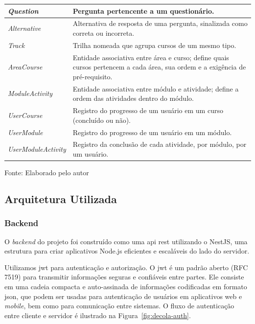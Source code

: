 \begin{quadro}[H]
{\begin{tabular}{|l|p{10.2cm}|}
        \hline
        \textit{Question} & Pergunta pertencente a um questionário. \\
        \hline
        \textit{Alternative} & Alternativa de resposta de uma pergunta, sinalizada como correta ou incorreta. \\
        \hline
        \textit{Track} & Trilha nomeada que agrupa cursos de um mesmo tipo. \\
        \hline
        \textit{AreaCourse} & Entidade associativa entre área e curso; define quais cursos pertencem a cada área, sua ordem e a exigência de pré-requisito. \\
        \hline
        \textit{ModuleActivity} & Entidade associativa entre módulo e atividade; define a ordem das atividades dentro do módulo. \\
        \hline
        \textit{UserCourse} & Registro do progresso de um usuário em um curso (concluído ou não). \\
        \hline
        \textit{UserModule} & Registro do progresso de um usuário em um módulo. \\
        \hline
        \textit{UserModuleActivity} & Registro da conclusão de cada atividade, por módulo, por um usuário. \\
        \hline
    \end{tabular}\par}

    Fonte: Elaborado pelo autor
    \label{quadro:decola-entidades}
\end{quadro}

\subsection{Arquitetura Utilizada}

\subsubsection{Backend}
  O \textit{backend} do projeto foi construído como uma \ac{api} \ac{rest} utilizando o NestJS, uma estrutura para criar aplicativos Node.js eficientes e escaláveis do lado do servidor.

  Utilizamos \ac{jwt} para autenticação e autorização. O \ac{jwt} é um padrão aberto (RFC 7519) para transmitir informações seguras e confiáveis entre partes. Ele consiste em uma cadeia compacta e auto-assinada de informações codificadas em formato \ac{json}, que podem ser usadas para autenticação de usuários em aplicativos web e \textit{mobile}, bem como para comunicação entre sistemas. O fluxo de autenticação entre cliente e servidor é ilustrado na Figura~\ref{fig:decola-auth}.

